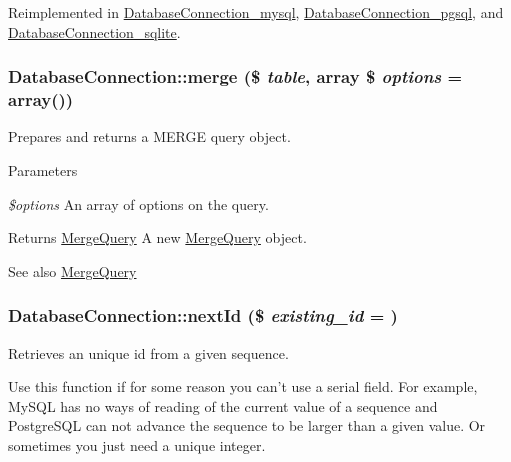 Reimplemented in \hyperlink{classDatabaseConnection__mysql_a8d36611a923f44b9dd5d1ed05ba84eb3}{DatabaseConnection\_\-mysql}, \hyperlink{classDatabaseConnection__pgsql_a71d8b6a2d7d97b3e194126abe714900f}{DatabaseConnection\_\-pgsql}, and \hyperlink{classDatabaseConnection__sqlite_aed69efc240fdb031430c8afbdb6c3ba9}{DatabaseConnection\_\-sqlite}.\hypertarget{classDatabaseConnection_ada81b5e7e2aa5f9741dc88474a917cff}{
\subsubsection[{merge}]{\setlength{\rightskip}{0pt plus 5cm}DatabaseConnection::merge (\$ {\em table}, \/  array \$ {\em options} = {\ttfamily array()})}}
\label{classDatabaseConnection_ada81b5e7e2aa5f9741dc88474a917cff}
Prepares and returns a MERGE query object.


\begin{DoxyParams}{Parameters}
\item[{\em \$options}]An array of options on the query.\end{DoxyParams}
\begin{DoxyReturn}{Returns}
\hyperlink{classMergeQuery}{MergeQuery} A new \hyperlink{classMergeQuery}{MergeQuery} object.
\end{DoxyReturn}
\begin{DoxySeeAlso}{See also}
\hyperlink{classMergeQuery}{MergeQuery} 
\end{DoxySeeAlso}
\hypertarget{classDatabaseConnection_a173e333ef1b61541cf37125468a37231}{
\subsubsection[{nextId}]{\setlength{\rightskip}{0pt plus 5cm}DatabaseConnection::nextId (\$ {\em existing\_\-id} = {})}}
\label{classDatabaseConnection_a173e333ef1b61541cf37125468a37231}
Retrieves an unique id from a given sequence.

Use this function if for some reason you can't use a serial field. For example, MySQL has no ways of reading of the current value of a sequence and PostgreSQL can not advance the sequence to be larger than a given value. Or sometimes you just need a unique integer.


